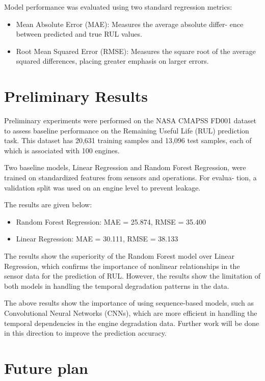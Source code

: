 \documentclass[11pt]{article}
\begin{document}
Model performance was evaluated using two standard regression metrics:

\begin{itemize}
\item Mean Absolute Error (MAE): Measures the average absolute differ-
ence between predicted and true RUL values.
\item Root Mean Squared Error (RMSE): Measures the square root of the
average squared differences, placing greater emphasis on larger errors.
\end{itemize}

\section{Preliminary Results}

Preliminary experiments were performed on the NASA CMAPSS FD001 dataset
to assess baseline performance on the Remaining Useful Life (RUL) prediction
task. This dataset has 20,631 training samples and 13,096 test samples, each of
which is associated with 100 engines.

Two baseline models, Linear Regression and Random Forest Regression,
were trained on standardized features from sensors and operations. For evalua-
tion, a validation split was used on an engine level to prevent leakage.

The results are given below:

\begin{itemize}
\item Random Forest Regression: MAE = 25.874, RMSE = 35.400
\item Linear Regression: MAE = 30.111, RMSE = 38.133
\end{itemize}

The results show the superiority of the Random Forest model over Linear
Regression, which confirms the importance of nonlinear relationships in the
sensor data for the prediction of RUL. However, the results show the limitation
of both models in handling the temporal degradation patterns in the data.

The above results show the importance of using sequence-based models, such
as Convolutional Neural Networks (CNNs), which are more efficient in handling
the temporal dependencies in the engine degradation data. Further work will
be done in this direction to improve the prediction accuracy.

\section{Future plan}
\end{document}
